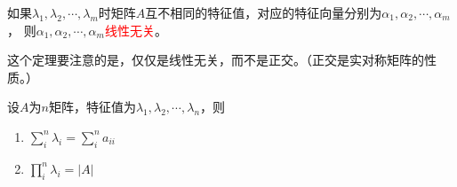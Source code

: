 \begin{theorem}
    如果$\lambda_1,\lambda_2,\cdots,\lambda_m$时矩阵$A$互不相同的特征值，对应的特征向量分别为$\alpha_1,\alpha_2,\cdots,\alpha_m$，
    则$\alpha_1,\alpha_2,\cdots,\alpha_m$\textcolor{red}{线性无关}。
\end{theorem}
这个定理要注意的是，仅仅是线性无关，而不是正交。（正交是实对称矩阵的性质。）

\begin{theorem}
    设$A$为$n$矩阵，特征值为$\lambda_1,\lambda_2,\cdots,\lambda_n$，则
    \begin{enumerate}
        \item $\sum_i^n \lambda_i = \sum_i^n a_{ii}$
        \item $\prod_i^n \lambda_i = |A|$
    \end{enumerate}
\end{theorem}

